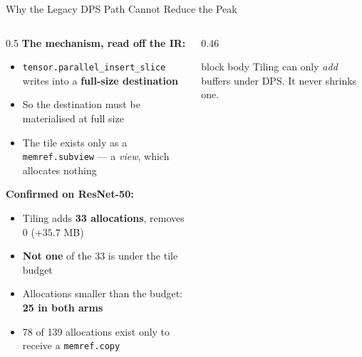 \documentclass[10pt,aspectratio=169]{beamer}
\begin{document}
\begin{frame}{Why the Legacy DPS Path Cannot Reduce the Peak}
\begin{columns}[T,totalwidth=0.99\textwidth]
\begin{column}{0.5\textwidth}
\textbf{The mechanism, read off the IR:}
\begin{itemize}
\small
\item \texttt{tensor.parallel\_insert\_slice} writes into a \textbf{full-size destination}
\item So the destination must be materialised at full size
\item The tile exists only as a \texttt{memref.subview} --- a \emph{view}, which allocates nothing
\end{itemize}

\vspace{0.2cm}
\textbf{Confirmed on ResNet-50:}
\begin{itemize}
\small
\item Tiling adds \textbf{33 allocations}, removes 0 ($+35.7$ MB)
\item \textcolor{edgered}{\textbf{Not one}} of the 33 is under the tile budget
\item Allocations smaller than the budget: \textbf{25 in both arms}
\item 78 of 139 allocations exist only to receive a \texttt{memref.copy}
\end{itemize}
\end{column}

\begin{column}{0.46\textwidth}
\centering
{}

\vspace{1.05cm}
\begin{beamercolorbox}[sep=0.3em,center,rounded=true,shadow=true]{block body}
\footnotesize
Tiling can only \emph{add} buffers under DPS. It never shrinks one.
\end{beamercolorbox}
\end{column}
\end{columns}


\end{frame}
\end{document}
